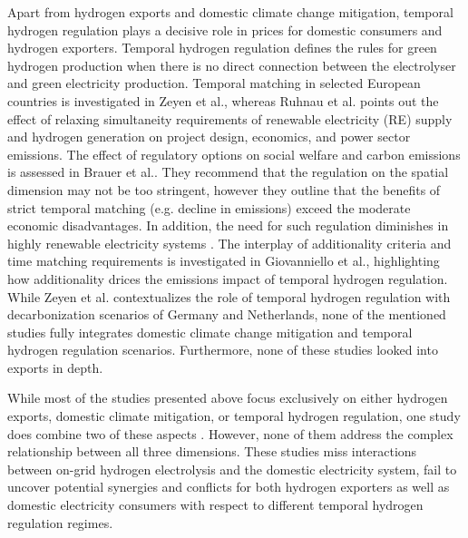 Apart from hydrogen exports and domestic climate change mitigation, temporal hydrogen regulation plays a decisive role in prices for domestic consumers and hydrogen exporters. 
Temporal hydrogen regulation defines the rules for green hydrogen production when there is no direct connection between the electrolyser and green electricity production.
Temporal matching in selected European countries is investigated in Zeyen et al.\cite{Zeyen2024}, whereas Ruhnau et al.\cite{Ruhnau2023a} points out the effect of relaxing simultaneity requirements of renewable electricity (RE) supply and hydrogen generation on project design, economics, and power sector emissions.
The effect of regulatory options on social welfare and carbon emissions is assessed in Brauer et al.\cite{Brauer2022}. They recommend that the regulation on the spatial dimension may not be too stringent, however they outline that the benefits of strict temporal matching (e.g. decline in emissions) exceed the moderate economic disadvantages. In addition, the need for such regulation diminishes in highly renewable electricity systems \cite{Brauer2022}.
The interplay of additionality criteria and time matching requirements is investigated in Giovanniello et al.\cite{Giovanniello2024}, highlighting how additionality drices the emissions impact of temporal hydrogen regulation.
While Zeyen et al.\cite{Zeyen2024} contextualizes the role of temporal hydrogen regulation with decarbonization scenarios of Germany and Netherlands, none of the mentioned studies fully integrates domestic climate change mitigation and temporal hydrogen regulation scenarios. Furthermore, none of these studies looked into exports in depth.

While most of the studies presented above focus exclusively on either hydrogen exports, domestic climate mitigation, or temporal hydrogen regulation, one study does combine two of these aspects \cite{Muller2024}. However, none of them address the complex relationship between all three dimensions. These studies miss interactions between on-grid hydrogen electrolysis and the domestic electricity system, fail to uncover potential synergies and conflicts for both hydrogen exporters as well as domestic electricity consumers with respect to different temporal hydrogen regulation regimes.


